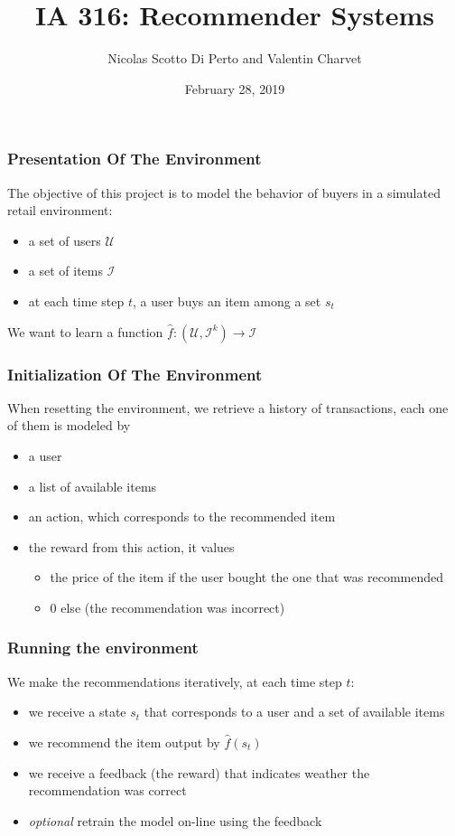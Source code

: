 \documentclass{beamer}
\title{IA 316: Recommender Systems}
\author{Nicolas Scotto Di Perto and Valentin Charvet}
\institute{Télécom ParisTech}
\date{February 28, 2019}
\begin{document}
\begin{frame}
	\titlepage
\end{frame}

\begin{frame}
	\frametitle{Presentation Of The Environment}
	The objective of this project is to model the behavior of buyers in a simulated retail environment:
	\begin{itemize}\itemsep=2ex
		\item a set of users $\mathcal{U}$
		\item a set of items $\mathcal{I}$
		\item at each time step $t$, a user buys an item among a set $s_t$
	\end{itemize} 
	We want to learn a function $\hat{f}: (\mathcal{U}, \mathcal{I}^k)  \rightarrow \mathcal{I}$
\end{frame}

\begin{frame}
	\frametitle{Initialization Of The Environment}
	When resetting the environment, we retrieve a history of transactions, each one of them is modeled by
	\begin{itemize}
		\item a user
		\item a list of available items
		\item an action, which corresponds to the recommended item
		\item the reward from this action, it values 
		\begin{itemize}
			\item the price of the item if the user bought the one that was recommended
			\item $0$ else (the recommendation was incorrect)
		\end{itemize}
	\end{itemize}
\end{frame}

\begin{frame}
	\frametitle{Running the environment}
	We make the recommendations iteratively, at each time step $t$:
	\begin{itemize}
		\item we receive a state $s_t$ that corresponds to a user and a set of available items
		\item we recommend the item output by $\hat{f}(s_t)$
		\item we receive a feedback (the reward) that indicates weather the recommendation was correct
		\item \textit{optional} retrain the model on-line using the feedback
	\end{itemize}
\end{frame}
\end{document}
